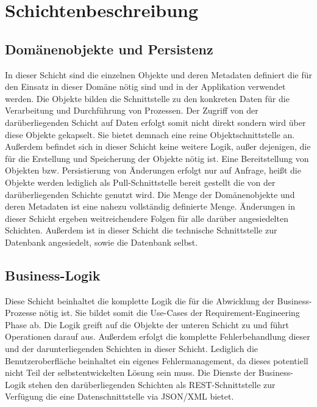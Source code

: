 \documentclass[a4paper,12pt]{article} %
\begin{document}
\section{Schichtenbeschreibung}

\subsection{Domänenobjekte und Persistenz}
In dieser Schicht sind die einzelnen Objekte und deren Metadaten definiert die für den Einsatz in dieser Domäne nötig sind und in der Applikation verwendet werden. Die Objekte bilden die Schnittstelle zu den konkreten Daten für die Verarbeitung und Durchführung von Prozessen. Der Zugriff von der darüberliegenden Schicht auf Daten erfolgt somit nicht direkt sondern wird über diese Objekte gekapselt. Sie bietet demnach eine reine Objektschnittstelle an. Außerdem befindet sich in dieser Schicht keine weitere Logik, außer dejenigen, die für die Erstellung und Speicherung der Objekte nötig ist.\newline
Eine Bereitstellung von Objekten bzw. Persistierung von Änderungen erfolgt nur auf Anfrage, heißt die Objekte werden lediglich als Pull-Schnittstelle bereit gestellt die von der darüberliegenden Schichte genutzt wird.\newline
Die Menge der Domänenobjekte und deren Metadaten ist eine nahezu vollständig definierte Menge. Änderungen in dieser Schicht ergeben weitreichendere Folgen für alle darüber angesiedelten Schichten. Außerdem ist in dieser Schicht die technische Schnittstelle zur Datenbank angesiedelt, sowie die Datenbank selbst.

\subsection{Business-Logik}
Diese Schicht beinhaltet die komplette Logik die für die Abwicklung der Business-Prozesse nötig ist. Sie bildet somit die Use-Cases der Requirement-Engineering Phase ab. Die Logik greift auf die Objekte der unteren Schicht zu und führt Operationen darauf aus. Außerdem erfolgt die komplette Fehlerbehandlung dieser und der darunterliegenden Schichten in dieser Schicht. Lediglich die Benutzeroberfläche beinhaltet ein eigenes Fehlermanagement, da dieses potentiell nicht Teil der selbstentwickelten Lösung sein muss. Die Dienste der Business-Logik stehen den darüberliegenden Schichten als REST-Schnittstelle zur Verfügung die eine Datenschnittstelle via JSON/XML bietet.
\end{document}
